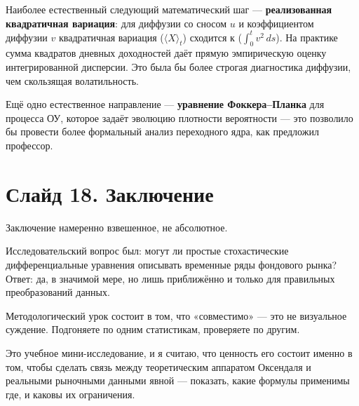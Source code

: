 \documentclass[12pt,a4paper]{article}
\begin{document}
Наиболее естественный следующий математический шаг ---
\textbf{реализованная квадратичная вариация}:
для диффузии со сносом $u$ и коэффициентом диффузии $v$
квадратичная вариация ($\langle X\rangle_t$)
сходится к ($\int_0^t v^2\,ds$).
На практике сумма квадратов дневных доходностей даёт прямую эмпирическую оценку
интегрированной дисперсии.
Это была бы более строгая диагностика диффузии, чем скользящая волатильность.

Ещё одно естественное направление --- \textbf{уравнение Фоккера--Планка}
для процесса ОУ,
которое задаёт эволюцию плотности вероятности ---
это позволило бы провести более формальный анализ переходного ядра,
как предложил профессор.

\section{Слайд 18. Заключение}

Заключение намеренно взвешенное, не абсолютное.

Исследовательский вопрос был: могут ли простые стохастические дифференциальные уравнения
описывать временные ряды фондового рынка?
Ответ: да, в значимой мере,
но лишь приближённо и только для правильных преобразований данных.

Методологический урок состоит в том, что «совместимо» --- это не визуальное суждение.
Подгоняете по одним статистикам, проверяете по другим.

Это учебное мини-исследование, и я считаю, что ценность его состоит именно
в том, чтобы сделать связь между теоретическим аппаратом Оксендаля
и реальными рыночными данными явной ---
показать, какие формулы применимы где, и каковы их ограничения.
\end{document}
